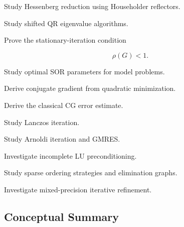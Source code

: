 \begin{exercise}[4]
Study Hessenberg reduction using Householder reflectors.
\end{exercise}

\begin{exercise}[4]
Study shifted QR eigenvalue algorithms.
\end{exercise}

\begin{exercise}[4]
Prove the stationary-iteration condition

\[
\rho(G)<1.
\]
\end{exercise}

\begin{exercise}[4]
Study optimal SOR parameters for model problems.
\end{exercise}

\begin{exercise}[4]
Derive conjugate gradient from quadratic minimization.
\end{exercise}

\begin{exercise}[4]
Derive the classical CG error estimate.
\end{exercise}

\begin{exercise}[4]
Study Lanczos iteration.
\end{exercise}

\begin{exercise}[4]
Study Arnoldi iteration and GMRES.
\end{exercise}

\begin{exercise}[4]
Investigate incomplete LU preconditioning.
\end{exercise}

\begin{exercise}[4]
Study sparse ordering strategies and elimination graphs.
\end{exercise}

\begin{exercise}[4]
Investigate mixed-precision iterative refinement.
\end{exercise}

\subsection{Conceptual Summary}
\label{subsec:nla-summary}

